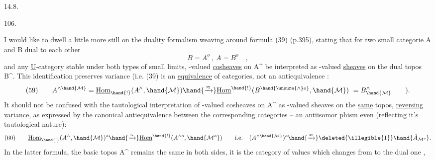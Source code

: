 
14.8.

106. 

I would like to dwell a little more still on the duality formalism
weaving around formula (39) (p.395), stating that for two  small categorie
A and B dual to each other
\[ B=A^{o} \ , \ A=B^{o} \quad , \]
and any \underline{U}-category  stable under both types of small limits, -valued
\uline{cosheaves} on A\^{}  be interpreted as -valued \uline{sheaves} on the dual topos
B\^{}. This identification preserves variance (i.e. (39) is an \uline{equivalence}
of categories, not an antiequivalence :
\[ (59) \qquad A^{\wedge\hand{\mathcal{M}}} = \underline{\mathrm{Hom}}_{\hand{!}}(A^{\wedge},\hand{\mathcal{M}}) \hand{\xrightarrow{\approx}} \underline{\mathrm{Hom}}^{\hand{!}}(B^{\hand{\unsure{\wedge}o}},\hand{\mathcal{M}}) \ = B^{\wedge}_{\hand{\mathcal{M}}} \qquad ). \]
It should not be confused with the tautological interpretation of
-valued cosheaves on A\^{} as -valued sheaves on the \uline{same} topos, 
 \uline{reversing} \uline{variance}, as expressed by the canonical  
antiequivalence between the corresponding categories -- an antiisomor
phism even (reflecting it's tautological nature):
\[ (60) \qquad \underline{\mathrm{Hom}}_{\hand{!}}(A^{\wedge},\hand{\mathcal{M}})^{o} \hand{\xrightarrow{\sim}} \underline{\mathrm{Hom}}^{\hand{!}}(A^{\wedge o},\hand{\mathcal{M}^{o}}) \qquad \text{i.e.} \quad (A^{\wedge\hand{\mathcal{M}}})^{o} \hand{\xrightarrow{\approx}} \deleted{\illegible{1}} \hand{\hat{A}_{\mathcal{M}^{o}}}. \]
In the latter formula, the basic topos A\^{} remains the same in both sides,
it is the category of values which changes from  to the dual one  ,

